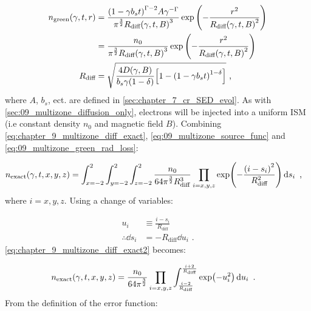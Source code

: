 \begin{equation}
    \begin{aligned}
        n_\text{green}\qty(\gamma,t,r)&=\frac{\qty(1-\gamma b_st)^{\Gamma-2}A\gamma^{-\Gamma}}{\pi^{\frac{3}{2}}R_\text{diff}\qty(\gamma,t,B)^3}\exp\qty(-\frac{r^2}{R_\text{diff}\qty(\gamma,t,B)^2}) \\
        &=\frac{n_0}{\pi^{\frac{3}{2}}R_\text{diff}\qty(\gamma,t,B)^3}\exp\qty(-\frac{r^2}{R_\text{diff}\qty(\gamma,t,B)^2}) \\
        R_\text{diff}&=\sqrt{\frac{4D\qty(\gamma,B)}{b_s\gamma\qty(1-\delta)}\qty[1-\qty(1-\gamma b_s t)^{1-\delta}]}\text{ ,} 
    \end{aligned} \label{eq:09_multizone_green_rad_loss}
\end{equation}
\noindent where $A$, $b_s$, ect. are defined in \autoref{sec:chapter_7_cr_SED_evol}. As with \autoref{sec:09_multizone_diffusion_only}, electrons will be injected into a uniform ISM (i.e constant density $n_0$ and magnetic field $B$). Combining \autoref{eq:chapter_9_multizone_diff_exact}, \autoref{eq:09_multizone_source_func} and \autoref{eq:09_multizone_green_rad_loss}:

\begin{equation}
	\begin{aligned}
		n_\text{exact}\qty(\gamma,t,x,y,z)&=\int_{x=-2}^{2}\int_{y=-2}^{2}\int_{z=-2}^{2}\frac{n_0}{64\pi^{\frac{3}{2}}R_\text{diff}^3}\prod_{i=x,y,z} \exp(-\frac{\qty(i-s_i)^2}{R_\text{diff}^2})\dd{s_i}\text{ ,} 
	\end{aligned} \label{eq:chapter_9_multizone_diff_exact2}
\end{equation}
\noindent where $i=x,y,z$. Using a change of variables:

\begin{equation}
	\begin{aligned}
		u_i&\equiv\frac{i-s_i}{R_\text{diff}} \\
		\therefore \dd{s_i}&=-R_\text{diff}\dd{u_i}\text{ .} 
	\end{aligned}
\end{equation}
\noindent \autoref{eq:chapter_9_multizone_diff_exact2} becomes:

\begin{equation}
	\begin{aligned}
		n_\text{exact}\qty(\gamma,t,x,y,z)&=\frac{n_0}{64\pi^{\frac{3}{2}}}\prod_{i=x,y,z}\int_{\frac{i-2}{R_\text{diff}}}^{\frac{i+2}{R_\text{diff}}}\exp(-u_i^2)\dd{u_i}\text{ .} 
	\end{aligned} \label{eq:09_diff_losses_temp}
\end{equation}
\noindent From the definition of the error function:

